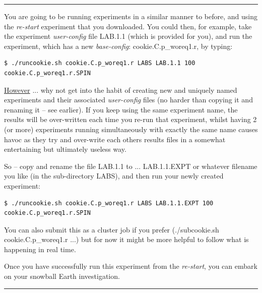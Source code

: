 \vspace{1mm}\noindent\rule{4cm}{0.5pt}\vspace{2mm}

\noindent You are going to be running experiments in a similar manner to before, and using the \textit{re-start} experiment that you downloaded. You could then, for example, take the experiment \textit{user-config} file \textsf{\footnotesize LAB.1.1} (which is provided for you), and run the experiment, which has a new \textit{base-config}: \textsf{\footnotesize cookie.C.p\_woreq1.r}, by typing:
\vspace{-1mm}\small\begin{verbatim}
$ ./runcookie.sh cookie.C.p_woreq1.r LABS LAB.1.1 100 cookie.C.p_woreq1.r.SPIN
\end{verbatim}\normalsize

\noindent \uline{However} ... why not get into the habit of creating new and uniquely named experiments and their associated \textit{user-config} files (no harder than copying it and renaming it -- see earlier). If you keep using the same experiment name, the results will be over-written each time you re-run that experiment, whilst having  2 (or more) experiments running simultaneously with exactly the same name causes havoc as they try and over-write each others results files in a somewhat entertaining but ultimately useless way. 

\vspace{1mm}
So -- copy and rename the file \textsf{\footnotesize LAB.1.1} to ... \textsf{\footnotesize LAB.1.1.EXPT} or whatever filename you like (in the sub-directory \textsf{\footnotesize LABS}), and then run your newly created experiment:
\vspace{-1mm}\small\begin{verbatim}
$ ./runcookie.sh cookie.C.p_woreq1.r LABS LAB.1.1.EXPT 100 cookie.C.p_woreq1.r.SPIN
\end{verbatim}\normalsize

You can also submit this as a cluster job if you prefer (\textsf{\footnotesize ./subcookie.sh cookie.C.p\_woreq1.r ...}) but for now it might be more helpful to follow what is happening in real time.

Once you have successfully run this experiment from the \textit{re-start}, you can embark on your snowball Earth investigation.

\vspace{-1mm}\noindent\rule{4cm}{0.5pt}\vspace{2mm}

